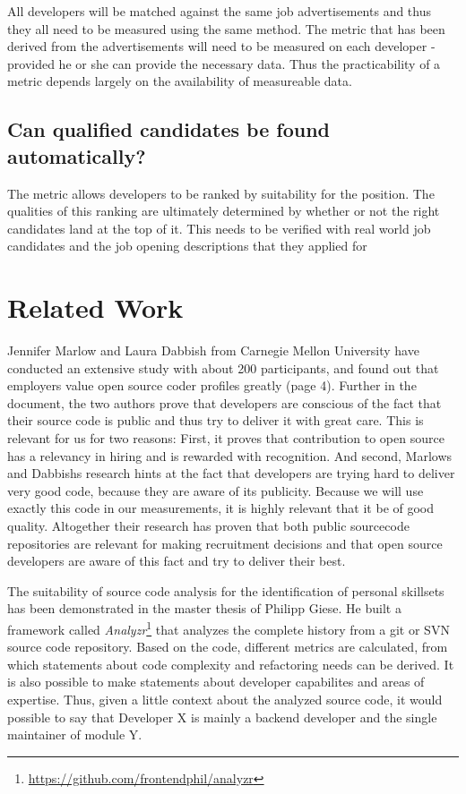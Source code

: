 All developers will be matched against the same job advertisements and thus
they all need to be measured using the same method. The metric that
has been derived from the advertisements will need to be measured
on each developer - provided he or she can provide the necessary data.
Thus the practicability of a metric depends largely on the availability
of measureable data.

\subsection{Can qualified candidates be found automatically?}\label{subsec:measurement-quality}
The metric allows developers to be ranked by suitability for the position.
The qualities of this ranking are ultimately determined by whether
or not the right candidates land at the top of it. This needs to be
verified with real world job candidates and the job opening descriptions
that they applied for

\section{Related Work}
Jennifer Marlow and Laura Dabbish\cite{md:2013} from Carnegie Mellon
University have conducted an extensive study with about
200 participants, and found out that employers value
open source coder profiles greatly (page 4). Further in the document,
the two authors prove that developers are conscious of the fact
that their source code is public and thus try to deliver it with
great care. This is relevant for us for two reasons:
First, it proves that contribution to open source has a relevancy
in hiring and is rewarded with recognition. And second, Marlows and Dabbishs
research hints at the fact that developers are trying hard to deliver very
good code, because they are aware of its publicity. Because we will use
exactly this code in our measurements, it is highly relevant that it be of good quality.
Altogether their research has proven that both public sourcecode repositories
are relevant for making recruitment decisions and that open source developers
are aware of this fact and try to deliver their best.
\newline

The suitability of source code analysis for the identification of personal
skillsets has been demonstrated in the master thesis of Philipp Giese.
He built a framework called \textit{Analyzr}\footnote{\url{https://github.com/frontendphil/analyzr}}
that analyzes the complete history from a git or SVN source code repository.
Based on the code, different metrics are calculated, from which statements about
code complexity and refactoring needs can be derived. It is also possible
to make statements about developer capabilites and areas of expertise.
Thus, given a little context about the analyzed source code, it would possible
to say that \glqq Developer X is mainly a backend developer and the single maintainer of module Y\grqq.
\newline

